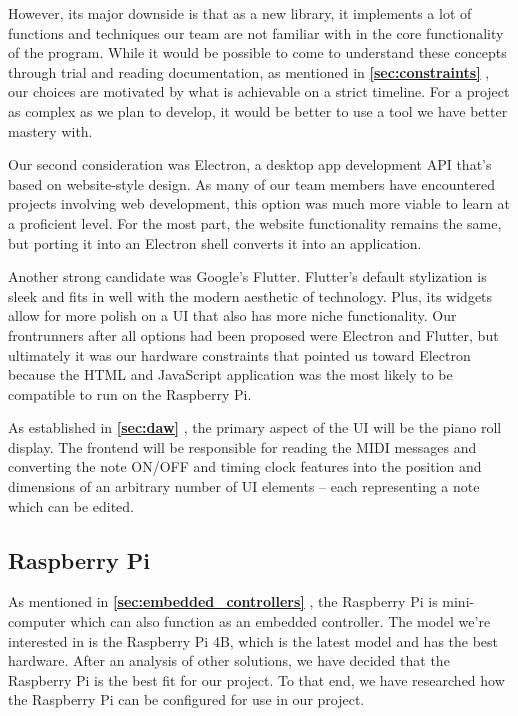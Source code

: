 However, its major downside is that as a new library, it implements a lot of functions and
techniques our team are not familiar with in the core functionality of the program. While it would
be possible to come to understand these concepts through trial and reading documentation, as
mentioned in \textbf{\ref{sec:constraints} }, our choices are motivated by
what is achievable on a strict timeline. For a project as complex as we plan to develop, it would
be better to use a tool we have better mastery with.

Our second consideration was Electron, a desktop app development API that’s based on website-style
design. As many of our team members have encountered projects involving web development, this
option was much more viable to learn at a proficient level. For the most part, the website
functionality remains the same, but porting it into an Electron shell converts it into an
application.

Another strong candidate was Google’s Flutter. Flutter’s default stylization is sleek and fits in
well with the modern aesthetic of technology. Plus, its widgets allow for more polish on a UI that
also has more niche functionality. Our frontrunners after all options had been proposed were
Electron and Flutter, but ultimately it was our hardware constraints that pointed us toward
Electron because the HTML and JavaScript application was the most likely to be compatible to run on
the Raspberry Pi.

As established in \textbf{\ref{sec:daw} }, the primary aspect of the UI
will be the piano roll display. The frontend will be responsible for reading the MIDI
messages and converting the note ON/OFF and timing clock features into the position and
dimensions of an arbitrary number of UI elements -- each representing a note which can be
edited.

\subsection{Raspberry Pi}

As mentioned in \textbf{\ref{sec:embedded_controllers} },
the Raspberry Pi is mini-computer which can also function as an embedded controller. The
model we're interested in is the Raspberry Pi 4B, which is the latest model and has the
best hardware. After an analysis of other solutions, we have decided that the
Raspberry Pi is the best fit for our project. To that end, we have researched how the
Raspberry Pi can be configured for use in our project.

